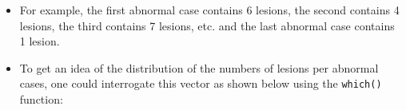 \documentclass[
]{book}
\newenvironment{Shaded}{\begin{snugshade}}{\end{snugshade}}
\newcommand{\CommentTok}[1]{\textcolor[rgb]{0.56,0.35,0.01}{\textit{#1}}}
\newcommand{\NormalTok}[1]{#1}
\newcommand{\OperatorTok}[1]{\textcolor[rgb]{0.81,0.36,0.00}{\textbf{#1}}}
\providecommand{\tightlist}{%
  \setlength{\itemsep}{0pt}\setlength{\parskip}{0pt}}
\begin{document}
\begin{Shaded}
\end{Shaded}

\begin{itemize}
\tightlist
\item
  For example, the first abnormal case contains 6 lesions, the second contains 4 lesions, the third contains 7 lesions, etc. and the last abnormal case contains 1 lesion.
\item
  To get an idea of the distribution of the numbers of lesions per abnormal cases, one could interrogate this vector as shown below using the \texttt{which()} function:
\end{itemize}
\end{document}
